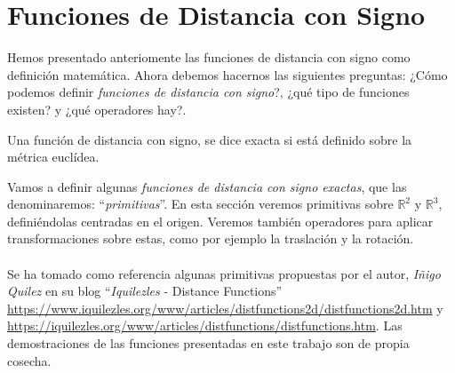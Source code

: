 \chapter{Funciones de Distancia con Signo\label{ch:fds}}
Hemos presentado anteriomente las funciones de distancia con signo como definición matemática. Ahora debemos hacernos las siguientes preguntas: ¿Cómo podemos definir \textit{funciones de distancia con signo}?, ¿qué tipo de funciones existen? y ¿qué operadores hay?.

\begin{definition}
Una función de distancia con signo, se dice exacta si está definido sobre la métrica euclídea.
\end{definition}

Vamos a definir algunas \textit{funciones de distancia con signo exactas}, que las denominaremos: \enquote{\textit{primitivas}}. En esta sección veremos primitivas sobre \(\mathbb{R}^2 \text{ y }\mathbb{R}^3\), definiéndolas centradas en el origen. Veremos también operadores para aplicar transformaciones sobre estas, como por ejemplo la traslación y la rotación.\\\\
Se ha tomado como referencia algunas primitivas propuestas por el autor, \textit{Iñigo Quilez} en su blog \enquote{\textit{Iquilezles} - Distance Functions} \url{https://www.iquilezles.org/www/articles/distfunctions2d/distfunctions2d.htm} y \url{https://iquilezles.org/www/articles/distfunctions/distfunctions.htm}. Las demostraciones de las funciones presentadas en este trabajo son de propia cosecha.


